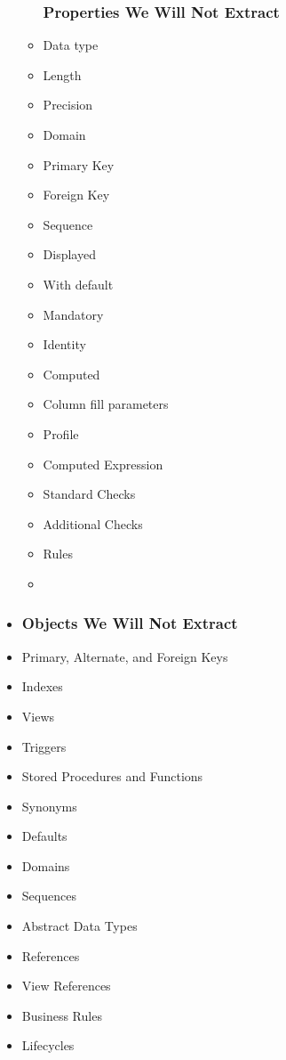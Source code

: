 \begin{itemize}
\begin{itemize}
		\subsubsection{Properties We Will Not Extract}
		\item Data type 
		\item Length 
		\item Precision
		\item Domain
		\item Primary Key
		\item Foreign Key
		\item Sequence
		\item Displayed
		\item With default
		\item Mandatory
		\item Identity
		\item Computed
		\item Column fill parameters
		\item Profile 
		\item Computed Expression
		\item Standard Checks
		\item Additional Checks
		\item Rules
		\item {}
	\end{itemize}
	\item {}
	\subsubsection{Objects We Will Not Extract}
	\item Primary, Alternate, and Foreign Keys 
	\item Indexes
	\item Views
	\item Triggers
	\item Stored Procedures and Functions
	\item Synonyms 
	\item Defaults
	\item Domains
	\item Sequences 
	\item Abstract Data Types
	\item References
	\item View References
	\item Business Rules
	\item Lifecycles
\end{itemize}

